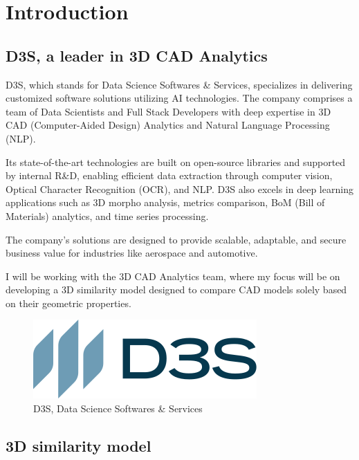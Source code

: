 \chapter{Introduction}
\label{chap:introduction}


\section{D3S, a leader in 3D CAD Analytics}

D3S, which stands for Data Science Softwares \& Services, specializes in delivering customized software solutions utilizing AI technologies. The company comprises a team of Data Scientists and Full Stack Developers with deep expertise in 3D CAD (Computer-Aided Design) Analytics and Natural Language Processing (NLP).  

Its state-of-the-art technologies are built on open-source libraries and supported by internal R\&D, enabling efficient data extraction through computer vision, Optical Character Recognition (OCR), and NLP. D3S also excels in deep learning applications such as 3D morpho analysis, metrics comparison, BoM (Bill of Materials) analytics, and time series processing. 

The company’s solutions are designed to provide scalable, adaptable, and secure business value for industries like aerospace and automotive.

\vspace{0.5cm}

I will be working with the 3D CAD Analytics team, where my focus will be on developing a 3D similarity model designed to compare CAD models solely based on their geometric properties.

\begin{figure}[]
    \centering
    \includegraphics[width=0.3\columnwidth]{images/d3s_logo.png}
    \caption{D3S, Data Science Softwares \& Services}
    \label{fig:d3s_logo}
\end{figure}

\section{3D similarity model}

